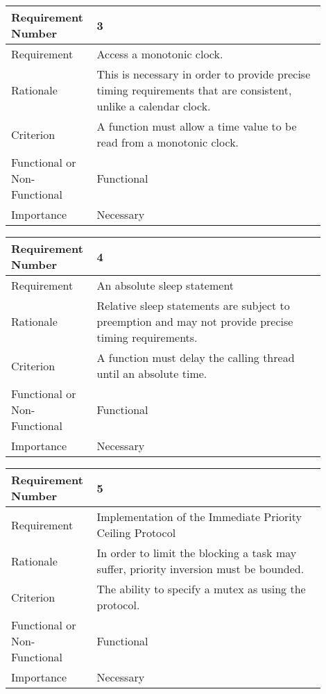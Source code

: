 \begin{table}[!htbp]
\centering
\begin{tabular}{|L{0.2\linewidth}|L{0.7\linewidth}|}
\hline
Requirement Number & 3 \\ \hline
Requirement & Access a monotonic clock. \\ \hline
Rationale      & This is necessary in order to provide precise timing requirements 
                that are consistent, unlike a calendar clock. \\ \hline
Criterion      & A function must allow a time value to be read from a monotonic
                clock. \\ \hline
Functional or Non-Functional & Functional \\ \hline
Importance     & Necessary \\ \hline
\end{tabular}
\end{table}
\begin{table}[!htbp]
\centering
\begin{tabular}{|L{0.2\linewidth}|L{0.7\linewidth}|}
\hline
Requirement Number & 4 \\ \hline
Requirement & An absolute sleep statement \\ \hline
Rationale      & Relative sleep statements are subject to preemption and may not 
                provide precise timing requirements. \\ \hline
Criterion      & A function must delay the calling thread until an absolute time. \\ \hline
Functional or Non-Functional & Functional \\ \hline
Importance     & Necessary \\ \hline
\end{tabular}
\end{table}
\begin{table}[!htbp]
\centering
\begin{tabular}{|L{0.2\linewidth}|L{0.7\linewidth}|}
\hline
Requirement Number & 5 \\ \hline
Requirement & Implementation of the Immediate Priority Ceiling Protocol \\ \hline
Rationale      & In order to limit the blocking a task may suffer, priority 
                inversion must be bounded. \\ \hline
Criterion      & The ability to specify a mutex as using the protocol.\\ \hline
Functional or Non-Functional & Functional \\ \hline
Importance     & Necessary \\ \hline
\end{tabular}
\end{table}

